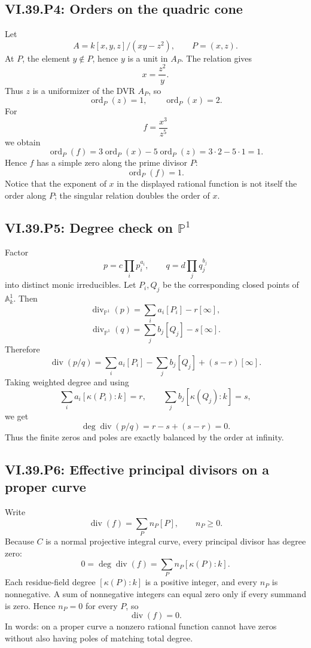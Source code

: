 \subsection*{VI.39.P4: Orders on the quadric cone}
\begin{solution}
Let
\[
 A=k[x,y,z]/(xy-z^2),\qquad P=(x,z).
\]
At \(P\), the element \(y\notin P\), hence \(y\) is a unit in \(A_P\).  The relation gives
\[
 x=\frac{z^2}{y}.
\]
Thus \(z\) is a uniformizer of the DVR \(A_P\), so
\[
 \operatorname{ord}_P(z)=1,
 \qquad
 \operatorname{ord}_P(x)=2.
\]
For
\[
 f=\frac{x^3}{z^5}
\]
we obtain
\[
 \operatorname{ord}_P(f)
 =3\operatorname{ord}_P(x)-5\operatorname{ord}_P(z)
 =3\cdot2-5\cdot1=1.
\]
Hence \(f\) has a simple zero along the prime divisor \(P\):
\[
 \boxed{\operatorname{ord}_P(f)=1.}
\]
Notice that the exponent of \(x\) in the displayed rational function is not itself the order along \(P\); the singular relation doubles the order of \(x\).
\end{solution}

\subsection*{VI.39.P5: Degree check on \(\mathbb P^1\)}
\begin{solution}
Factor
\[
 p=c\prod_i p_i^{a_i},\qquad q=d\prod_j q_j^{b_j}
\]
into distinct monic irreducibles.  Let \(P_i,Q_j\) be the corresponding closed points of \(\mathbb A^1_k\).  Then
\[
 \operatorname{div}_{\mathbb P^1}(p)
 =\sum_i a_i[P_i]-r[\infty],
\]
\[
 \operatorname{div}_{\mathbb P^1}(q)
 =\sum_j b_j[Q_j]-s[\infty].
\]
Therefore
\[
 \operatorname{div}(p/q)
 =\sum_i a_i[P_i]-\sum_j b_j[Q_j]+(s-r)[\infty].
\]
Taking weighted degree and using
\[
 \sum_i a_i[\kappa(P_i):k]=r,
 \qquad
 \sum_j b_j[\kappa(Q_j):k]=s,
\]
we get
\[
 \deg\operatorname{div}(p/q)=r-s+(s-r)=0.
\]
Thus the finite zeros and poles are exactly balanced by the order at infinity.
\end{solution}

\subsection*{VI.39.P6: Effective principal divisors on a proper curve}
\begin{solution}
Write
\[
 \operatorname{div}(f)=\sum_P n_P[P],\qquad n_P\ge0.
\]
Because \(C\) is a normal projective integral curve, every principal divisor has degree zero:
\[
 0=\deg\operatorname{div}(f)
 =\sum_P n_P[\kappa(P):k].
\]
Each residue-field degree \([\kappa(P):k]\) is a positive integer, and every \(n_P\) is nonnegative.  A sum of nonnegative integers can equal zero only if every summand is zero.  Hence \(n_P=0\) for every \(P\), so
\[
 \boxed{\operatorname{div}(f)=0.}
\]
In words: on a proper curve a nonzero rational function cannot have zeros without also having poles of matching total degree.
\end{solution}

